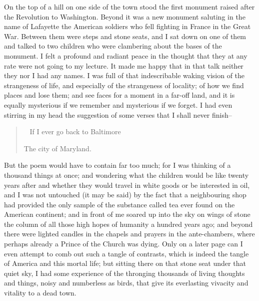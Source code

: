 \documentclass{book}
\newenvironment{mdblockquote}{%
  \begin{quotation}
    \
}{%
  \end{quotation}
}
\begin{document}
On the top of a hill on one side of the town stood the first monument raised after the Revolution to Washington. Beyond it was a new monument saluting in the name of Lafayette the American soldiers who fell fighting in France in the Great War. Between them were steps and stone seats, and I sat down on one of them and talked to two children who were clambering about the bases of the monument. I felt a profound and radiant peace in the thought that they at any rate were not going to my lecture. It made me happy that in that talk neither they nor I had any names. I was full of that indescribable waking vision of the strangeness of life, and especially of the strangeness of locality; of how we find places and lose them; and see faces for a moment in a far-off land, and it is equally mysterious if we remember and mysterious if we forget. I had even stirring in my head the suggestion of some verses that I shall never finish–

\begin{mdblockquote}
	If I ever go back to Baltimore

	The city of Maryland.


\end{mdblockquote}
But the poem would have to contain far too much; for I was thinking of a thousand things at once; and wondering what the children would be like twenty years after and whether they would travel in white goods or be interested in oil, and I was not untouched (it may be said) by the fact that a neighbouring shop had provided the only sample of the substance called tea ever found on the American continent; and in front of me soared up into the sky on wings of stone the column of all those high hopes of humanity a hundred years ago; and beyond there were lighted candles in the chapels and prayers in the ante-chambers, where perhaps already a Prince of the Church was dying. Only on a later page can I even attempt to comb out such a tangle of contrasts, which is indeed the tangle of America and this mortal life; but sitting there on that stone seat under that quiet sky, I had some experience of the thronging thousands of living thoughts and things, noisy and numberless as birds, that give its everlasting vivacity and vitality to a dead town.
\end{document}
